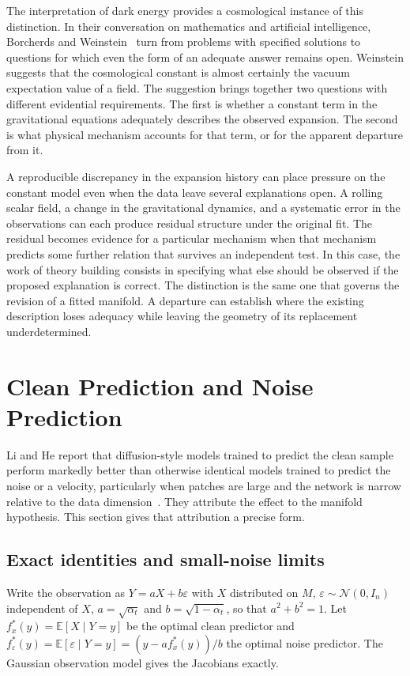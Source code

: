 \documentclass[11pt,a4paper]{article}
\theoremstyle{definition}
\theoremstyle{remark}
\begin{document}
The interpretation of dark energy provides a cosmological instance of this
distinction. In their conversation on mathematics and artificial
intelligence, Borcherds and Weinstein~\cite{borcherds2026conversation} turn
from problems with specified solutions to questions for which even the form
of an adequate answer remains open. Weinstein suggests that the cosmological
constant is almost certainly the vacuum expectation value of a field. The
suggestion brings together two questions with different evidential
requirements. The first is whether a constant term in the gravitational
equations adequately describes the observed expansion. The second is what
physical mechanism accounts for that term, or for the apparent departure from
it.

A reproducible discrepancy in the expansion history can place pressure on the
constant model even when the data leave several explanations open. A rolling
scalar field, a change in the gravitational dynamics, and a systematic error
in the observations can each produce residual structure under the original
fit. The residual becomes evidence for a particular mechanism when that
mechanism predicts some further relation that survives an independent test.
In this case, the work of theory building consists in specifying what else
should be observed if the proposed explanation is correct. The distinction is
the same one that governs the revision of a fitted manifold. A departure can
establish where the existing description loses adequacy while leaving the
geometry of its replacement underdetermined.

\section{Clean Prediction and Noise Prediction}\label{sec:jit}

Li and He report that diffusion-style models trained to predict the clean
sample perform markedly better than otherwise identical models trained to
predict the noise or a velocity, particularly when patches are large and
the network is narrow relative to the data dimension~\cite{li2025backtobasics}.
They attribute the effect to the manifold hypothesis. This section gives
that attribution a precise form.

\subsection{Exact identities and small-noise limits}

Write the observation as $Y=aX+b\varepsilon$ with $X$ distributed on $M$,
$\varepsilon\sim\mathcal{N}(0,I_n)$ independent of $X$, $a=\sqrt{\alpha_t}$ and
$b=\sqrt{1-\alpha_t}$, so that $a^2+b^2=1$. Let
$f_x^\ast(y)=\mathbb{E}[X\mid Y=y]$ be the optimal clean predictor and
$f_\varepsilon^\ast(y)=\mathbb{E}[\varepsilon\mid Y=y]=(y-a f_x^\ast(y))/b$ the
optimal noise predictor. The Gaussian observation model gives the Jacobians
exactly.
\end{document}
